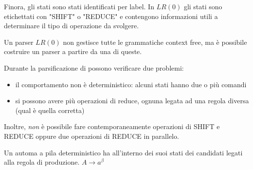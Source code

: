 \documentclass[11pt]{article}
\begin{document}
Finora, gli stati sono stati identificati per label. In $LR(0)$ gli stati sono etichettati con "SHIFT" o "REDUCE" e contengono 
informazioni utili a determinare il tipo di operazione da svolgere.

Un parser $LR(0)$ non gestisce tutte le grammatiche context free, ma è possibile costruire un parser a partire da una di
queste.

Durante la parsificazione di possono verificare due problemi:
\begin{itemize}
    \item il comportamento non è deterministico: alcuni stati hanno due o più comandi
    \item si possono avere più operazioni di reduce, ognuna legata ad una regola diversa (qual è quella corretta)
\end{itemize}
Inoltre, \textit{non} è possibile fare contemporaneamente operazioni di SHIFT e REDUCE oppure due operazioni di REDUCE in 
parallelo.

Un automa a pila deterministico ha all'interno dei suoi stati dei candidati legati alla regola di produzione.
$A\rightarrow a^\beta$
\end{document}
